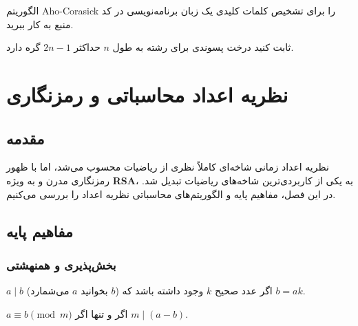 \documentclass{matinbook}
\begin{document}
    \begin{exercise}
        الگوریتم Aho-Corasick را
        برای تشخیص کلمات کلیدی
        یک زبان برنامه‌نویسی
        در کد منبع به کار ببرید.
        \label{exc:aho-syntax}
    \end{exercise}
    
    \begin{exercise}
        ثابت کنید درخت پسوندی برای
        رشته به طول $n$ حداکثر
        $2n-1$ گره دارد.
        \label{exc:suffix-tree-nodes}
    \end{exercise}
    
    
    
    \chapter{نظریه اعداد محاسباتی و رمزنگاری}
    \label{chap:number-theory}
    
    \section{مقدمه}
    
    نظریه اعداد زمانی شاخه‌ای
    کاملاً نظری از ریاضیات محسوب می‌شد،
    اما با ظهور رمزنگاری
    مدرن و به ویژه \textbf{RSA}،
    به یکی از کاربردی‌ترین شاخه‌های
    ریاضیات تبدیل شد. در این فصل،
    مفاهیم پایه و الگوریتم‌های محاسباتی
    نظریه اعداد را بررسی می‌کنیم.
    
    \section{مفاهیم پایه}
    
    \subsection{بخش‌پذیری و همنهشتی}
    
    \begin{definition}
        $a \mid b$ (بخوانید $a$ می‌شمارد $b$)
        اگر عدد صحیح $k$ وجود داشته باشد
        که $b = ak$.
        \label{def:divisibility}
    \end{definition}
    
    \begin{definition}[همنهشتی]
        $a \equiv b \pmod{m}$ اگر و تنها اگر
        $m \mid (a - b)$.
        \label{def:congruence}
    \end{definition}
    
\end{document}
